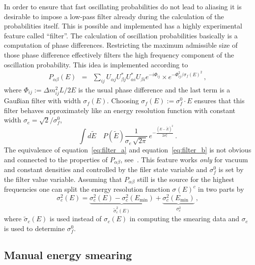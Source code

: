 In order to ensure that fast oscillating probabilities do not lead to aliasing
it is desirable to impose a low-pass filter already during the calculation
of the probabilities itself. This is possible and implemented has a highly
experimental feature called ``filter''. 
The calculation of oscillation
probabilities basically is a computation of phase differences. Restricting
the maximum admissible size of those phase difference effectively filters
the high frequency component of the oscillation probability. This idea is
implemented according to
\begin{eqnarray}
\label{eq:filter_a}
P_{\alpha\beta}(E)&=&\sum_{ij}
U_{\alpha j} U^*_{\beta j} U^*_{\alpha i} U_{\beta i} 
e^{-i\Phi_{ij}}\times 
e^{ -\Phi_{ij}^2/\sigma_f(E)^2 }\,,
\end{eqnarray}
where $\Phi_{ij}:=\Delta m_{ij}^2 L/2E$ is the usual phase difference and
the last term is a Gau\ss ian filter with width $\sigma_f(E)$. Choosing
$\sigma_f(E):=\sigma_f^0 \cdot E$ ensures that this filter behaves 
approximately like an energy resolution function with constant width 
$\sigma_e=\sqrt{2}/\sigma_f^0$, \ie\
\begin{equation}
\label{eq:filter_b}
\int d\tilde E\quad P(\tilde E) \frac{1}{\sigma_e\,\sqrt{2\pi}}\,
e^{-\frac{(E-\tilde E)^2}{2\sigma^2_e}}\,.
\end{equation}
The equivalence of equation~\ref{eq:filter_a} and equation~\ref{eq:filter_b}
is not obvious and connected to the properties of $P_{\alpha\beta}$, 
see~\cite{Kiers:1996zj,Giunti:2003ax}. This feature works \emph{only} 
for vacuum and constant densities and controlled
by the filer state variable and $\sigma_f^0$ is set by the filter value 
variable. Assuming that $P_{\alpha\beta}$ still is the source for the highest
frequencies one can split the energy resolution function $\sigma(E)^c$ in
two parts by
\begin{equation}
\sigma_c^2(E)=\underbrace{\sigma_c^2(E)-\sigma_c^2(E_\mathrm{min})}_
{\tilde\sigma^2_c(E)}+\underbrace{\sigma_c^2(E_\mathrm{min})}_{\sigma_e^2}\,,
\end{equation}
where $\tilde\sigma_c(E)$ is used instead of $\sigma_c(E)$ in computing the
smearing data and $\sigma_e$ is used to determine $\sigma_f^0$.

\subsection{Manual energy smearing}

